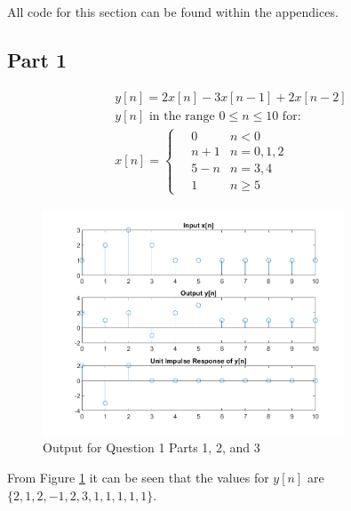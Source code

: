 All code for this section can be found within the appendices.

\subsection{Part 1}

\begin{gather*}
	y[n]=2x[n]-3x[n-1]+2x[n-2] \\
y[n] \text{ in the range } 0 \le n \le 10 \text{ for:} \\
	x[n]=\begin{cases}
		\quad 0   & n < 0 \\
		\quad n+1 & n=0,1,2 \\
		\quad 5-n & n=3,4 \\
		\quad 1   & n\ge 5
	\end{cases}
\end{gather*}

\begin{figure}[H]
	\centering
	\includegraphics[width=0.8\textwidth]{images/Q1.png}
	\caption{Output for Question 1 Parts 1, 2, and 3}
	\label{fig:Q1Img}
\end{figure}

From Figure \ref{fig:Q1Img} it can be seen that the values for $y[n]$ are
$\{2,1,2,-1,2,3,1,1,1,1,1\}.$

